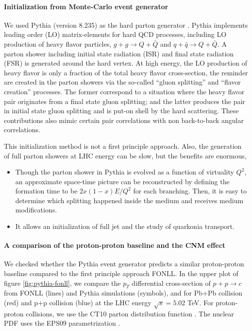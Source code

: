 \paragraph{Initialization from Monte-Carlo event generator}
We used Pythia (version 8.235) as the hard parton generator \cite{Sjostrand:2014zea, Sjostrand:2006za}.
Pythia implements leading order (LO) matrix-elements for hard QCD processes, including LO production of heavy flavor particles,
$g+g\rightarrow Q+\bar{Q}$ and $q+\bar{q}\rightarrow Q+\bar{Q}$.
A parton shower including initial state radiation (ISR) and final state radiation (FSR) is generated around the hard vertex.
At high energy, the LO production of heavy flavor is only a fraction of the total heavy flavor cross-section, the reminder are created in the parton showers via the so-called ``gluon splitting'' and ``flavor creation'' processes.
The former correspond to a situation where the heavy flavor pair originates from a final state gluon splitting; and the latter produces the pair in initial state gluon splitting and is put-on shell by the hard scattering.
These contributions also mimic certain pair correlations with non back-to-back angular correlations.

This initialization method is not a first principle approach. 
Also, the generation of full parton showers at LHC energy can be slow, but the benefits are enormous,
\begin{itemize}
\item Though the parton shower in Pythia is evolved as a function of virtuality $Q^2$, an approximate space-time picture can be reconstructed by defining the formation time to be $2x(1-x)E/Q^2$ for each branching. Then, it is easy to determine which splitting happened inside the medium and receives medium modifications.
\item It allows an initialization of full jet and the study of quarkonia transport.
\end{itemize}

\paragraph{A comparison of the proton-proton baseline and the CNM effect}
We checked whether the Pythia event generator predicts a similar proton-proton baseline compared to the first principle approach FONLL.
In the upper plot of figure \ref{fig:pythia-fonll}, we compare the $p_T$ differential cross-section of $p+p\rightarrow c$ from FONLL (lines) and Pythia simulations (symbols), and for Pb+Pb collision (red) and p+p collision (blue) at the LHC energy $\sqrt{s}=5.02$ TeV.
For proton-proton collisions, we use the CT10 parton distribution function \cite{Lai:2010vv}.
The nuclear PDF uses the EPS09 parametrization \cite{Eskola:2009uj}.

